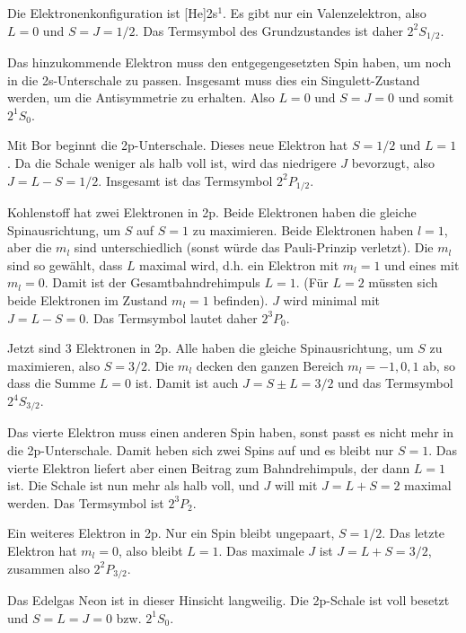 \begin{description}\setlength{\itemsep}{0pt}

    \item[Lithium] Die Elektronenkonfiguration ist [He]2s$^1$. Es gibt nur ein Valenzelektron, also $L=0$ und $S=J=1/2$. Das Termsymbol des Grundzustandes ist daher $2^2S_{1/2}$.
    
    \item[Beryllium] Das hinzukommende Elektron muss den entgegengesetzten Spin haben, um noch in die 2s-Unterschale zu passen. Insgesamt muss dies ein Singulett-Zustand werden, um die Antisymmetrie zu erhalten. Also $L=0$ und $S=J=0$ und somit $2^1S_0$.
    
    \item[Bor] Mit Bor beginnt die 2p-Unterschale. Dieses neue Elektron hat $S=1/2$ und $L=1$. Da die Schale weniger als halb voll ist, wird das niedrigere $J$ bevorzugt, also $J=L-S = 1/2$. Insgesamt ist das Termsymbol $2^2P_{1/2}$.
    
    \item[Kohlenstoff] Kohlenstoff hat zwei Elektronen in 2p. Beide Elektronen haben die gleiche Spinausrichtung, um $S$ auf $S=1$ zu maximieren. Beide Elektronen haben $l=1$, aber die $m_l$ sind unterschiedlich (sonst würde das Pauli-Prinzip verletzt). Die $m_l$ sind so gewählt, dass $L$ maximal wird, d.h. ein Elektron mit $m_l=1$ und eines mit $m_l=0$. Damit ist der Gesamtbahndrehimpuls $L=1$. (Für $L=2$ müssten sich beide Elektronen im Zustand $m_l = 1$ befinden). $J$ wird minimal mit $J=L-S =0$. Das Termsymbol lautet daher $2^3P_0$.
    
    \item[Stickstoff] Jetzt sind 3 Elektronen in 2p. Alle haben die gleiche Spinausrichtung, um $S$ zu maximieren, also $S=3/2$. Die $m_l$ decken den ganzen Bereich $m_l = -1, 0, 1$ ab, so dass die Summe $L= 0$ ist. Damit ist auch $J = S \pm L = 3/2$ und das Termsymbol $2^4S_{3/2}$.
    
    \item[Sauerstoff] Das vierte Elektron muss einen anderen Spin haben, sonst passt es nicht mehr in die 2p-Unterschale. Damit heben sich zwei Spins auf und es bleibt nur $S=1$. Das vierte Elektron liefert aber einen Beitrag zum Bahndrehimpuls, der dann $L=1$ ist. Die Schale ist nun mehr als halb voll, und $J$ will mit $J=L+S=2$ maximal werden. Das Termsymbol ist $2^3P_2$.
    
    \item[Fluor] Ein weiteres Elektron in 2p. Nur ein Spin bleibt ungepaart, $S=1/2$. Das letzte Elektron hat $m_l = 0$, also bleibt $L=1$. Das maximale $J$ ist $J=L+S = 3/2$, zusammen also $2^2P_{3/2}$.
    
    \item[Neon] Das Edelgas Neon ist in dieser Hinsicht langweilig. Die 2p-Schale ist voll besetzt und $S = L = J = 0$ bzw. $2^1S_0$.   
\end{description}

